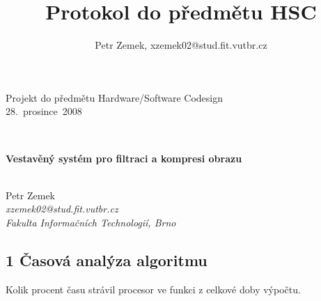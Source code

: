 \documentclass[12pt,a4paper]{article}
\title{Protokol do předmětu HSC}
\author{Petr Zemek, xzemek02@stud.fit.vutbr.cz}
\begin{document}
\noindent
\begin{small}Projekt do předmětu Hardware/Software Codesign \\ 28.~prosince~2008\end{small} \\

\begin{center}
	\begin{large}\textbf{Vestavěný systém pro filtraci a kompresi obrazu}\end{large} \\
	\vspace{0.4cm}
	Petr Zemek \\
	\textit{xzemek02@stud.fit.vutbr.cz} \\
	\textit{Fakulta Informačních Technologií, Brno} \\
\end{center}

\subsection*{1 Časová analýza algoritmu}

Kolik procent času strávil procesor ve funkci z celkové doby výpočtu.

\end{document}
